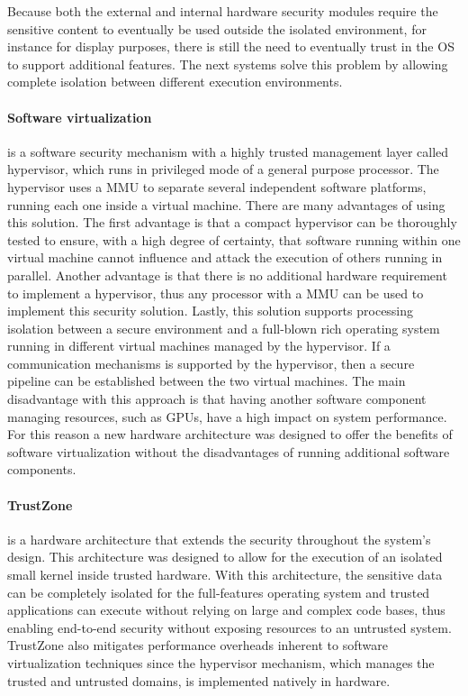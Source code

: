 Because both the external and internal hardware security modules require the sensitive content to eventually be used outside the isolated environment, for instance for display purposes, there is still the need to eventually trust in the OS to support additional features. The next systems solve this problem by allowing complete isolation between different execution environments.

\paragraph{\textbf{Software virtualization}} is a software security mechanism with a highly trusted management layer called hypervisor, which runs in privileged mode of a general purpose processor. The hypervisor uses a \ac{MMU} to separate several independent software platforms, running each one inside a virtual machine. There are many advantages of using this solution. The first advantage is that a compact hypervisor can be thoroughly tested to ensure, with a high degree of certainty, that software running within one virtual machine cannot influence and attack the execution of others running in parallel. Another advantage is that there is no additional hardware requirement to implement a hypervisor, thus any processor with a \ac{MMU} can be used to implement this security solution. Lastly, this solution supports processing isolation between a secure environment and a full-blown rich operating system running in different virtual machines managed by the hypervisor. If a communication mechanisms is supported by the hypervisor, then a secure pipeline can be established between the two virtual machines.
The main disadvantage with this approach is that having another software component managing resources, such as GPUs, have a high impact on system performance. For this reason a new hardware architecture was designed to offer the benefits of software virtualization without the disadvantages of running additional software components.

\paragraph{\textbf{TrustZone}} is a hardware architecture that extends the security throughout the system's design. This architecture was designed to allow for the execution of an isolated small kernel inside trusted hardware. With this architecture, the sensitive data can be completely isolated for the full-features operating system and trusted applications can execute without relying on large and complex code bases, thus enabling end-to-end security without exposing resources to an untrusted system. TrustZone also mitigates performance overheads inherent to software virtualization techniques since the hypervisor mechanism, which manages the trusted and untrusted domains, is implemented natively in hardware.

